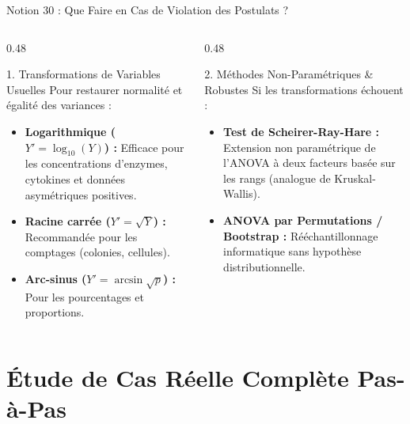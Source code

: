\documentclass[aspectratio=169,10pt]{beamer}
\begin{document}
\begin{frame}{Notion 30 : Que Faire en Cas de Violation des Postulats ?}
  \begin{columns}[onlytextwidth, T]
    \begin{column}{0.48\linewidth}
      \begin{biobox}{1. Transformations de Variables Usuelles}
        Pour restaurer normalité et égalité des variances :
        \begin{itemize}
          \item \textbf{Logarithmique ($Y' = \log_{10}(Y)$) :} Efficace pour les concentrations d'enzymes, cytokines et données asymétriques positives.
          \item \textbf{Racine carrée ($Y' = \sqrt{Y}$) :} Recommandée pour les comptages (colonies, cellules).
          \item \textbf{Arc-sinus ($Y' = \arcsin\sqrt{p}$) :} Pour les pourcentages et proportions.
        \end{itemize}
      \end{biobox}
    \end{column}
    \begin{column}{0.48\linewidth}
      \begin{warnbox}{2. Méthodes Non-Paramétriques \& Robustes}
        Si les transformations échouent :
        \begin{itemize}
          \item \textbf{Test de Scheirer-Ray-Hare :} Extension non paramétrique de l'ANOVA à deux facteurs basée sur les rangs (analogue de Kruskal-Wallis).
          \item \textbf{ANOVA par Permutations / Bootstrap :} Rééchantillonnage informatique sans hypothèse distributionnelle.
        \end{itemize}
      \end{warnbox}
    \end{column}
  \end{columns}
\end{frame}

\section{Étude de Cas Réelle Complète Pas-à-Pas}
\end{document}
